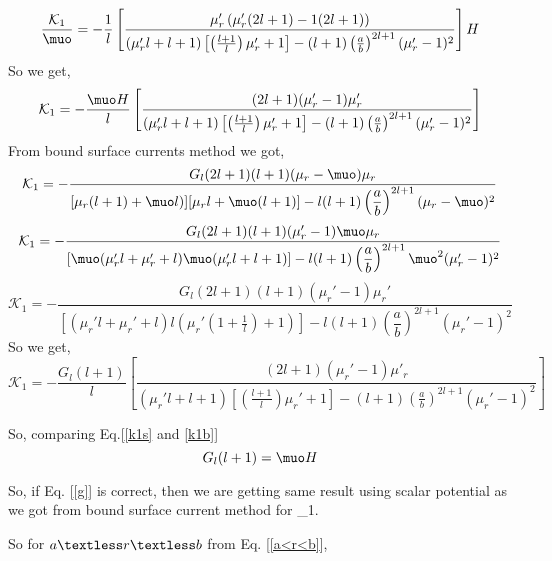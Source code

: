 $$\frac{\mathcal{K}_1}{\muo}=-\frac{1}{l}\left[\frac{\mu'_r\left(\mu_r'(2l+1)-1(2l+1)\right)}{(\mu_r'l+l+1)\left[\left(\frac{l+1}{l}\right)\mu_r'+1\right]-(l+1)\left(\frac{a}{b}\right)^{2l+1}(\mu_r'-1)^2}\right]H$$
So we get,
\begin{equation}\label{k1s}
\mathcal{K}_1=-\frac{\muo H}{l}\left[\frac{(2l+1)(\mu_r'-1)\mu'_r}{(\mu_r'l+l+1)\left[\left(\frac{l+1}{l}\right)\mu_r'+1\right]-(l+1)\left(\frac{a}{b}\right)^{2l+1}(\mu_r'-1)^2}\right]
\end{equation}
From bound surface currents method we got,
$$\mathcal{K}_1=-\frac{G_l(2l+1)(l+1)(\mu_r-\muo)\mu_r}{[\mu_r(l+1)+\muo l)][\mu_r l+\muo(l+1)]-l(l+1)\left(\dfrac{a}{b}\right)^{2l+1}(\mu_r-\muo)^2}$$
$$\mathcal{K}_1=-\frac{G_l(2l+1)(l+1)(\mu_r'-1)\muo\mu_r}{[\muo(\mu_r' l+\mu_r'+ l)\muo(\mu_r' l+l+1)]-l(l+1)\left(\dfrac{a}{b}\right)^{2l+1}\muo^2(\mu_r'-1)^2}$$
$$\mathcal{K}_1=-\frac{G_l(2l+1)(l+1)(\mu_r'-1)\mu_r'}{[(\mu_r' l+\mu_r'+ l)l(\mu_r'( 1+\frac{1}{l})+1)]-l(l+1)\left(\dfrac{a}{b}\right)^{2l+1}(\mu_r'-1)^2}$$
So we get,
\begin{equation}\label{k1b}
\mathcal{K}_1=-\frac{G_l (l+1)}{l}\left[\frac{(2l+1)(\mu_r'-1)\mu'_r}{(\mu_r'l+l+1)\left[\left(\frac{l+1}{l}\right)\mu_r'+1\right]-(l+1)\left(\frac{a}{b}\right)^{2l+1}(\mu_r'-1)^2}\right]
\end{equation}

So, comparing Eq.[\ref{k1s} and \ref{k1b}]
\begin{equation}\label{g}
G_l(l+1)=\muo H
\end{equation}

So, if Eq. [\ref{g}] is correct, then we are getting same result using scalar potential as we got from bound surface current method for _1.




So for \(a\textless r\textless b \) from Eq. [\ref{a<r<b}],

